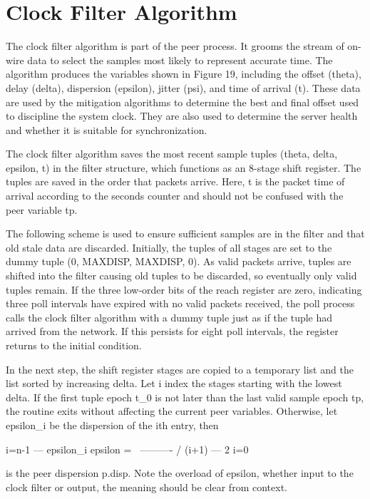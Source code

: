 \chapter{Clock Filter Algorithm}

The clock filter algorithm is part of the peer process.  It grooms
the stream of on-wire data to select the samples most likely to
represent accurate time.  The algorithm produces the variables shown
in Figure 19, including the offset (theta), delay (delta), dispersion
(epsilon), jitter (psi), and time of arrival (t).  These data are
used by the mitigation algorithms to determine the best and final
offset used to discipline the system clock.  They are also used to
determine the server health and whether it is suitable for
synchronization.

The clock filter algorithm saves the most recent sample tuples
(theta, delta, epsilon, t) in the filter structure, which functions
as an 8-stage shift register.  The tuples are saved in the order that
packets arrive.  Here, t is the packet time of arrival according to
the seconds counter and should not be confused with the peer variable
tp.

The following scheme is used to ensure sufficient samples are in the
filter and that old stale data are discarded.  Initially, the tuples
of all stages are set to the dummy tuple (0, MAXDISP, MAXDISP, 0).
As valid packets arrive, tuples are shifted into the filter causing
old tuples to be discarded, so eventually only valid tuples remain.
If the three low-order bits of the reach register are zero,
indicating three poll intervals have expired with no valid packets
received, the poll process calls the clock filter algorithm with a
dummy tuple just as if the tuple had arrived from the network.  If
this persists for eight poll intervals, the register returns to the
initial condition.

In the next step, the shift register stages are copied to a temporary
list and the list sorted by increasing delta.  Let i index the stages
starting with the lowest delta.  If the first tuple epoch t_0 is not
later than the last valid sample epoch tp, the routine exits without
affecting the current peer variables.  Otherwise, let epsilon_i be
the dispersion of the ith entry, then

                  i=n-1
                  ---     epsilon_i
  epsilon =       \     ----------
                  /        (i+1)
                  ---     2
                  i=0

is the peer dispersion p.disp.  Note the overload of epsilon, whether
input to the clock filter or output, the meaning should be clear from
context.

